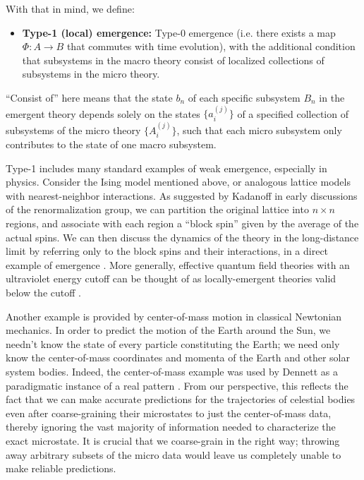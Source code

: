 \documentclass[12pt,english]{article}
\newcommand{\autocite}{\cite}
\begin{document}
With that in mind, we define:
\begin{itemize}
    \item \textbf{Type-1 (local) emergence:} Type-0 emergence  (i.e. there exists a map $\Phi:A \rightarrow B$ that commutes with time evolution), with the additional condition that subsystems in the macro theory consist of localized collections of subsystems in the micro theory. 
\end{itemize}
``Consist of'' here means that the state $b_n$ of each specific subsystem $B_n$ in the emergent theory depends solely on the states $\{a_i^{(j)}\}$ of a specified collection of subsystems of the micro theory $\{A_i^{(j)}\}$, such that each micro subsystem only contributes to the state of one macro subsystem.

Type-1 includes many standard examples of weak emergence, especially in physics.
Consider the Ising model mentioned above, or analogous lattice models with nearest-neighbor interactions. 
As suggested by Kadanoff in early discussions of the renormalization group, we can partition the original lattice into $n\times n$ regions, and associate with each region a ``block spin'' given by the average of the actual spins.
We can then discuss the dynamics of the theory in the long-distance limit by referring only to the block spins and their interactions, in a direct example of emergence \autocite{kadanoff1966scaling}.
More generally, effective quantum field theories with an ultraviolet energy cutoff can be thought of as locally-emergent theories valid below the cutoff \autocite{burgess2007introduction}.

Another example is provided by center-of-mass motion in classical Newtonian mechanics.
In order to predict the motion of the Earth around the Sun, we needn't know the state of every particle constituting the Earth; we need only know the center-of-mass coordinates and momenta of the Earth and other solar system bodies.
Indeed, the center-of-mass example was used by Dennett as a paradigmatic instance of a real pattern \autocite{Dennett1991-DENRP}.
From our perspective, this reflects the fact that we can make accurate predictions for the trajectories of celestial bodies even after coarse-graining their microstates to just the center-of-mass data, thereby ignoring the vast majority of information needed to characterize the exact microstate. 
It is crucial that we coarse-grain in the right way; throwing away arbitrary subsets of the micro data would leave us completely unable to make reliable predictions.
\end{document}
